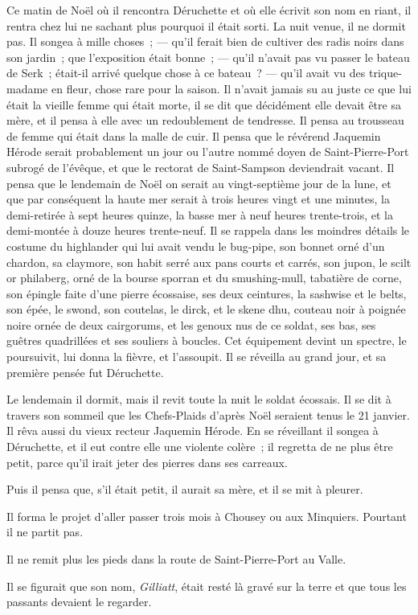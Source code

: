 \documentclass[french,twoside]{book} %
\begin{document}
Ce matin de Noël où il rencontra Déruchette et où elle écrivit son nom en riant, il rentra chez lui ne sachant plus pourquoi il était sorti. La nuit venue, il ne dormit pas. Il songea à mille choses ; — qu’il ferait bien de cultiver des radis noirs dans son jardin ; que l’exposition était bonne ; — qu’il n’avait pas vu passer le bateau de Serk ; était-il arrivé quelque chose à ce bateau ? — qu’il avait vu des trique-madame en fleur, chose rare pour la saison. Il n’avait jamais su au juste ce que lui était la vieille femme qui était morte, il se dit que décidément elle devait être sa mère, et il  pensa à elle avec un redoublement de tendresse. Il pensa au trousseau de femme qui était dans la malle de cuir. Il pensa que le révérend Jaquemin Hérode serait probablement un jour ou l’autre nommé doyen de Saint-Pierre-Port subrogé de l’évêque, et que le rectorat de Saint-Sampson deviendrait vacant. Il pensa que le lendemain de Noël on serait au vingt-septième jour de la lune, et que par conséquent la haute mer serait à trois heures vingt et une minutes, la demi-retirée à sept heures quinze, la basse mer à neuf heures trente-trois, et la demi-montée à douze heures trente-neuf. Il se rappela dans les moindres détails le costume du highlander qui lui avait vendu le bug-pipe, son bonnet orné d’un chardon, sa claymore, son habit serré aux pans courts et carrés, son jupon, le scilt or philaberg, orné de la bourse sporran et du smushing-mull, tabatière de corne, son épingle faite d’une pierre écossaise, ses deux ceintures, la sashwise et le belts, son épée, le swond, son coutelas, le dirck, et le skene dhu, couteau noir à poignée noire ornée de deux cairgorums, et les genoux nus de ce soldat, ses bas, ses guêtres quadrillées et ses souliers à boucles. Cet équipement devint un spectre, le poursuivit, lui donna la fièvre, et l’assoupit. Il se réveilla au grand jour, et sa première pensée fut Déruchette.\par
Le lendemain il dormit, mais il revit toute la nuit le soldat écossais. Il se dit à travers son sommeil que les Chefs-Plaids d’après Noël seraient tenus le 21 janvier. Il rêva aussi du vieux recteur Jaquemin Hérode. En se réveillant il songea à Déruchette, et il eut contre  elle une violente colère ; il regretta de ne plus être petit, parce qu’il irait jeter des pierres dans ses carreaux.\par
Puis il pensa que, s’il était petit, il aurait sa mère, et il se mit à pleurer.\par
Il forma le projet d’aller passer trois mois à Chousey ou aux Minquiers. Pourtant il ne partit pas.\par
Il ne remit plus les pieds dans la route de Saint-Pierre-Port au Valle.\par
Il se figurait que son nom, \emph{Gilliatt}, était resté là gravé sur la terre et que tous les passants devaient le regarder.
\end{document}

